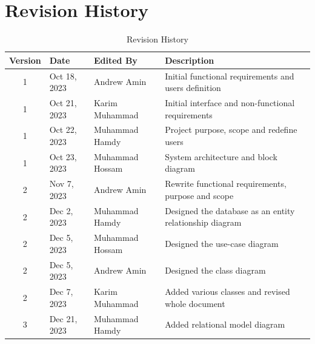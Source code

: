 \documentclass{BusMateSRS}
\def\nameAndrew{Andrew Amin}
\def\nameKarim{Karim Muhammad}
\def\nameHamdy{Muhammad Hamdy}
\def\nameHossam{Muhammad Hossam}
\begin{document}
\maketitle
\tableofcontents
\listoffigures
\listoftables

\chapter*{Revision History}
\begin{table}[ht!]
	\centering
	\begin{tabularx}{\textwidth}{|c|l|l|X|}
		\hline
		\textbf{Version} & \textbf{Date} & \textbf{Edited By} & \textbf{Description} \\
		\hline
		1                & Oct 18, 2023  & \nameAndrew        &
		Initial functional requirements and users definition                         \\
		\hline
		1                & Oct 21, 2023  & \nameKarim         &
		Initial interface and non-functional requirements                            \\
		\hline
		1                & Oct 22, 2023  & \nameHamdy         &
		Project purpose, scope and redefine users                                    \\
		\hline
		1                & Oct 23, 2023  & \nameHossam        &
		System architecture and block diagram                                        \\
		\hline
		2                & Nov 7, 2023   & \nameAndrew        &
		Rewrite functional requirements, purpose and scope                           \\
		\hline
		2                & Dec 2, 2023   & \nameHamdy         &
		Designed the database as an entity relationship diagram                      \\
		\hline
		2                & Dec 5, 2023   & \nameHossam        &
		Designed the use-case diagram                                                \\
		\hline
		2                & Dec 5, 2023   & \nameAndrew        &
		Designed the class diagram                                                   \\
		\hline
		2                & Dec 7, 2023   & \nameKarim         &
		Added various classes and revised whole document                             \\
		\hline
		3                & Dec 21, 2023   & \nameHamdy        &
		Added relational model diagram                                               \\
		\hline
	\end{tabularx}
	\caption{Revision History}
	\label{tab:revision-history}
\end{table}
\end{document}
